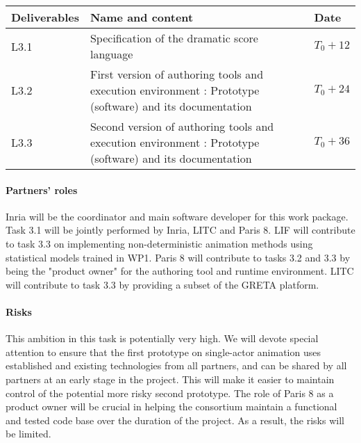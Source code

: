 \begin{tabular}{|l|p{10cm}|l|}\hline
Deliverables & Name and content  & Date  \\\hline
L3.1  & Specification of the dramatic score language &  $T_0+12$   \\\hline
L3.2  & First version of authoring tools and execution environment : Prototype (software) and its documentation &  $T_0+24$  \\\hline
L3.3  & Second version of authoring tools and execution environment : Prototype (software) and its documentation &  $T_0+36$   \\\hline
\end{tabular}

\paragraph{Partners' roles}
Inria will be the coordinator and main software developer for this work package.  Task 3.1 will be jointly performed by Inria, LITC and Paris 8.
LIF will contribute to task 3.3 on implementing non-deterministic animation  methods using statistical models trained in WP1. Paris 8 will contribute 
to tasks 3.2 and 3.3 by being the "product owner" for the authoring tool and runtime environment. LITC will contribute to task   3.3 by providing a subset 
of the GRETA platform.

\paragraph{Risks}
This ambition in this task is potentially very high. We will devote special attention to  ensure that the first prototype on single-actor animation 
uses established and existing  technologies from all partners, and can be shared by all partners at an early stage in the project. This will make
it easier to maintain control of the potential more risky second prototype. The role of Paris 8 as a product owner will be crucial in helping the 
consortium maintain a functional and tested code base over the duration of the project. As a result, the risks will be limited.

\endinput
